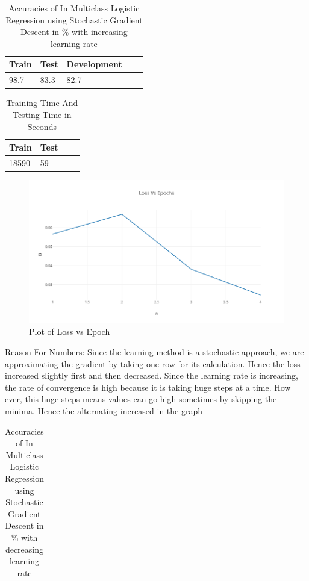 \documentclass[flalign]{article}
\begin{document}
\begin{enumerate}
		\begin{table}[h]
			\centering
			\caption{Accuracies of In Multiclass Logistic Regression using Stochastic Gradient Descent in  \% with increasing learning rate}
			\begin{tabular}{|l|l|l|l|l|}
				\hline
				Train & Test  & Development \\ \hline
			 	98.7 & 83.3 & 82.7 \\ \hline
			\end{tabular}
		\end{table}
		\begin{table}[h]
			\centering
			\caption{Training Time And Testing Time in Seconds}
			\begin{tabular}{|l|l|l|l|}
				\hline
				Train & Test  \\ \hline
			 	18590 & 59 \\ \hline
			\end{tabular}
		\end{table}
		\begin{figure}[H]
			\centering
			\includegraphics[scale=0.4]{f2.png}
			\caption{Plot of Loss vs Epoch}
		\end{figure}
		Reason For Numbers: Since the learning method is a stochastic approach, we are approximating the gradient by taking one row for its calculation. Hence the loss increased slightly first and then decreased. Since the learning rate is increasing, the rate of convergence is high because it is taking huge steps at a time. How ever, this huge steps means values can go high sometimes by skipping the minima. Hence the alternating increased in the graph
		\begin{table}[h]
			\centering
			\caption{Accuracies of In Multiclass Logistic Regression using Stochastic Gradient Descent in  \% with decreasing learning rate}
			\begin{tabular}{|l|l|l|l|l|}

\end{tabular}
\end{table}
\end{enumerate}
\end{document}
